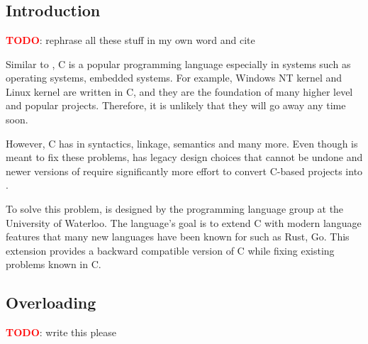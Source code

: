 \chapter{\CFA}
\section{Introduction}
\textbf{\textcolor{red}{TODO}}: rephrase all these stuff in my own word and cite

Similar to \CC, C is a popular programming language especially in systems such
as operating systems, embedded systems. For example, Windows NT kernel and
Linux kernel are written in C, and they are the foundation of many higher level
and popular projects. Therefore, it is unlikely that they will go away any time soon.

However, C has in syntactics, linkage, semantics and many
more. Even though \CC is meant to fix these problems, \CC has legacy design
choices that cannot be undone and newer versions of \CC require significantly
more effort to convert C-based projects into \CC.

To solve this problem, \CFA is designed by the programming language group at the
University of Waterloo. The language's goal is to extend C with modern language
features that many new languages have been known for such as Rust, Go. This
extension provides a backward compatible version of C while fixing existing
problems known in C.

\section{Overloading}
\textbf{\textcolor{red}{TODO}}: write this please
